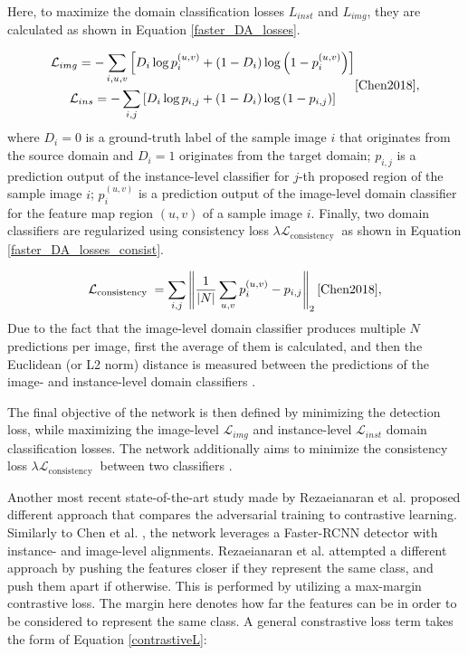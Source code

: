 Here, to maximize the domain classification losses $L_{inst}$ and $L_{img}$, they are calculated as shown in Equation \ref{faster_DA_losses}. 

\begin{equation}
\label{faster_DA_losses} 
\begin{gathered}
\mathcal{L}_{i m g}=-\sum_{i, u, v}\left[D_{i} \log p_{i}^{(u, v)}+\left(1-D_{i}\right) \log \left(1-p_{i}^{(u, v)}\right)\right] \\ 
\mathcal{L}_{i n s} = -\sum_{i, j}\left[D_{i} \log p_{i, j}+\left(1-D_{i}\right) \log \left(1-p_{i, j}\right)\right]
\end{gathered}
\cite{Chen2018}, 
\end{equation}
where $D_i=0$ is a ground-truth label of the sample image $i$ that originates from  the source domain and $D_i=1$ originates from the target domain; $p_{i,j}$ is a prediction output of the instance-level classifier for $j$-th proposed region of the sample image $i$; $p_{i}^{(u, v)}$ is a prediction output of the image-level domain classifier for the feature map region $(u,v)$ of a sample image $i$. 
Finally, two domain classifiers are regularized using consistency loss $\lambda \mathcal{L}_{\text {consistency }}$ as shown in Equation \ref{faster_DA_losses_consist}.  

\begin{equation}
\label{faster_DA_losses_consist} 
\mathcal{L}_{\text {consistency }}=\sum_{i, j}\left\|\frac{1}{|N|} \sum_{u, v} p_{i}^{(u, v)}-p_{i, j}\right\|_{2}
\cite{Chen2018}, 
\end{equation}
Due to the fact that the image-level domain classifier produces multiple $N$ predictions per image, first the average of them is calculated, and then the Euclidean (or L2 norm) distance is measured between the predictions of the image- and instance-level domain classifiers \cite{Chen2018}. 

The final objective of the network is then defined by minimizing the detection loss, while maximizing the image-level $\mathcal{L}_{img}$ and instance-level $\mathcal{L}_{inst}$ domain classification losses. The network additionally aims to minimize the consistency loss $\lambda \mathcal{L}_{\text {consistency }}$ between two classifiers \cite{Chen2018}.

Another most recent state-of-the-art study made by Rezaeianaran et al. \cite{Rezaeianaran2021} proposed different approach that compares the adversarial training to contrastive learning. Similarly to Chen et al. \cite{Chen2018}, the network leverages a Faster-RCNN detector with instance- and image-level alignments. Rezaeianaran et al. attempted a different approach by pushing the features closer if they represent the same class, and push them apart if otherwise. This is performed by utilizing a max-margin contrastive loss. The margin here denotes how far the features can be in order to be considered to represent the same class. A general constrastive loss term takes the form of Equation \ref{contrastiveL}:


